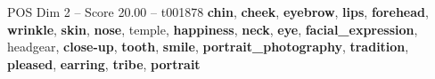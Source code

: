 \begin{textsample}{POS Dim 2 – Score 20.00 – t001878}  \label{ex:f2_pos_027}
\textbf{chin}, \textbf{cheek}, \textbf{eyebrow}, \textbf{lips}, \textbf{forehead}, \textbf{wrinkle}, \textbf{skin}, \textbf{nose}, temple, \textbf{happiness}, \textbf{neck}, \textbf{eye}, \textbf{facial\_expression}, headgear, \textbf{close-up}, \textbf{tooth}, \textbf{smile}, \textbf{portrait\_photography}, \textbf{tradition}, \textbf{pleased}, \textbf{earring}, \textbf{tribe}, \textbf{portrait}

\end{textsample}
